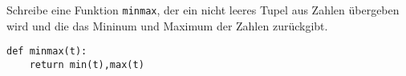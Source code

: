 \question[2]
Schreibe eine Funktion \texttt{minmax}, der ein nicht leeres Tupel aus Zahlen
übergeben wird und die das Mininum und Maximum der Zahlen zurückgibt.
\begin{solutionbox}{3cm}
\begin{lstlisting}
def minmax(t):
    return min(t),max(t)
\end{lstlisting}
\end{solutionbox}
